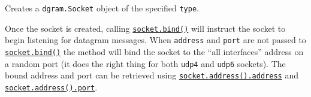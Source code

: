 Creates a \texttt{dgram.Socket} object of the specified \texttt{type}.

Once the socket is created, calling
\hyperref[socketbindport-address-callback]{\texttt{socket.bind()}} will
instruct the socket to begin listening for datagram messages. When
\texttt{address} and \texttt{port} are not passed to
\hyperref[socketbindport-address-callback]{\texttt{socket.bind()}} the
method will bind the socket to the ``all interfaces'' address on a
random port (it does the right thing for both \texttt{udp4} and
\texttt{udp6} sockets). The bound address and port can be retrieved
using \hyperref[socketaddress]{\texttt{socket.address().address}} and
\hyperref[socketaddress]{\texttt{socket.address().port}}.
